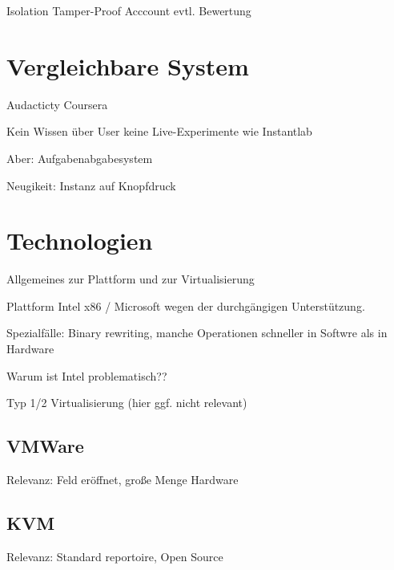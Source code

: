 		Isolation
		Tamper-Proof
		Acccount
		evtl. Bewertung

	

\section{Vergleichbare System}
\label{sec:solutions}
		
		Audacticty
		Coursera

		Kein Wissen über User
		keine Live-Experimente wie Instantlab

		Aber: Aufgabenabgabesystem
		
		Neugikeit: Instanz auf Knopfdruck
		
\section{Technologien}
\label{sec:technologies}

		Allgemeines zur Plattform und zur Virtualisierung

		Plattform Intel x86 / Microsoft wegen der durchgängigen Unterstützung. \cite{PopekGoldberg}

		Spezialfälle: Binary rewriting, manche Operationen schneller in Softwre als in Hardware

		Warum ist Intel problematisch??

		Typ 1/2 Virtualisierung (hier ggf. nicht relevant)


		\subsection{VMWare}

		Relevanz: Feld eröffnet, große Menge Hardware

		\subsection{KVM}

		Relevanz: Standard reportoire, Open Source

		